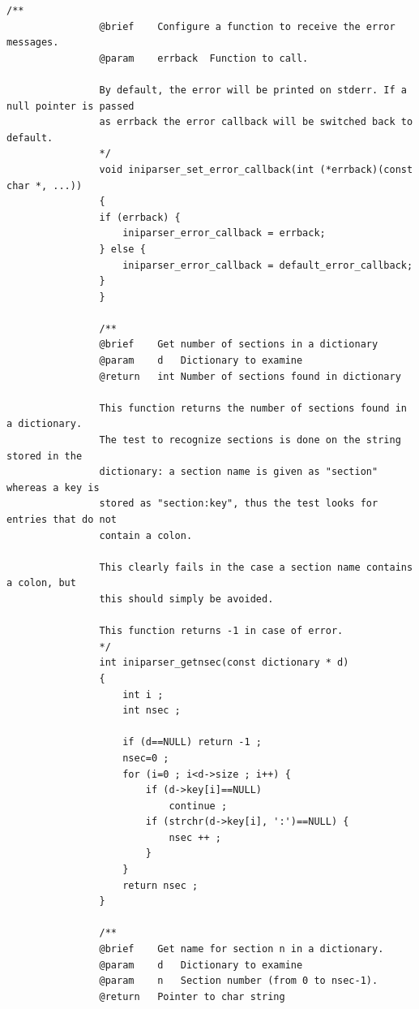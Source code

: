 \documentclass{article}
\begin{document}
\begin{Verbatim}[gobble=8]
                /**
                @brief    Configure a function to receive the error messages.
                @param    errback  Function to call.
                
                By default, the error will be printed on stderr. If a null pointer is passed
                as errback the error callback will be switched back to default.
                */
                void iniparser_set_error_callback(int (*errback)(const char *, ...))
                {
                if (errback) {
                    iniparser_error_callback = errback;
                } else {
                    iniparser_error_callback = default_error_callback;
                }
                }
                
                /**
                @brief    Get number of sections in a dictionary
                @param    d   Dictionary to examine
                @return   int Number of sections found in dictionary
                
                This function returns the number of sections found in a dictionary.
                The test to recognize sections is done on the string stored in the
                dictionary: a section name is given as "section" whereas a key is
                stored as "section:key", thus the test looks for entries that do not
                contain a colon.
                
                This clearly fails in the case a section name contains a colon, but
                this should simply be avoided.
                
                This function returns -1 in case of error.
                */
                int iniparser_getnsec(const dictionary * d)
                {
                    int i ;
                    int nsec ;
                
                    if (d==NULL) return -1 ;
                    nsec=0 ;
                    for (i=0 ; i<d->size ; i++) {
                        if (d->key[i]==NULL)
                            continue ;
                        if (strchr(d->key[i], ':')==NULL) {
                            nsec ++ ;
                        }
                    }
                    return nsec ;
                }
                
                /**
                @brief    Get name for section n in a dictionary.
                @param    d   Dictionary to examine
                @param    n   Section number (from 0 to nsec-1).
                @return   Pointer to char string
                

\end{Verbatim}
\end{document}
